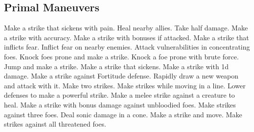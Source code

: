 \subsection{Primal Maneuvers}\label{Primal Maneuvers}
\begin{spelllist}
 Make a strike that sickens with pain.
 Heal nearby allies.
 Take half damage.
 Make a strike with  accuracy.
 Make a strike with bonuses if attacked.
 Make a strike that inflicts fear.
 Inflict fear on nearby enemies.
 Attack vulnerabilities in concentrating foes.
 Knock foes prone and make a strike.
 Knock a foe prone with brute force.
 Jump and make a strike.
 Make a strike that sickens.
 Make a strike with \plus1d damage.
 Make a strike against Fortitude defense.
 Rapidly draw a new weapon and attack with it.
 Make two strikes.
 Make strikes while moving in a line.
 Lower defenses to make a powerful strike.
 Make a melee strike against a creature to heal.
 Make a strike with bonus damage against unbloodied foes.
 Make strikes against three foes.
 Deal sonic damage in a cone.
 Make a strike and move.
 Make strikes against all threatened foes.
\end{spelllist}



\small
